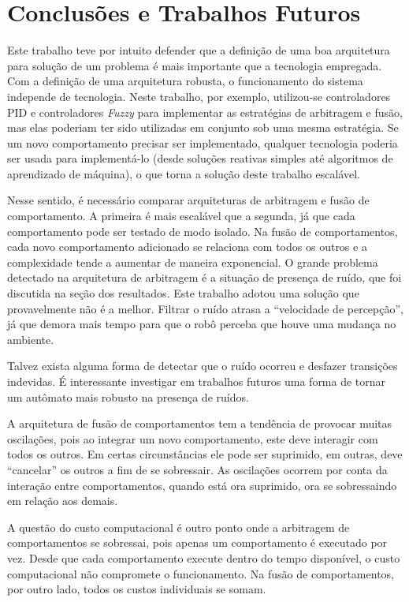 \chapter{Conclusões e Trabalhos Futuros}
\vspace{-2.5 cm}

Este trabalho teve por intuito defender que a definição de uma boa arquitetura para solução de um problema é
mais importante que a tecnologia empregada. Com a definição de uma arquitetura robusta, o funcionamento do sistema 
independe de tecnologia. Neste trabalho, por exemplo, utilizou-se controladores PID e controladores \textit{Fuzzy}
para implementar as estratégias de arbitragem e fusão, mas elas poderiam ter sido utilizadas em conjunto sob uma mesma
estratégia. Se um novo comportamento precisar ser implementado, qualquer tecnologia poderia ser usada para 
implementá-lo (desde soluções reativas simples até algoritmos de aprendizado de máquina), o que torna a solução
deste trabalho escalável.

Nesse sentido, é necessário comparar arquiteturas de arbitragem e fusão de comportamento. A primeira é mais escalável
que a segunda, já que cada comportamento pode ser testado de modo isolado. Na fusão de comportamentos, cada novo
comportamento adicionado se relaciona com todos os outros e a complexidade tende a aumentar de maneira exponencial.
O grande problema detectado na arquitetura de arbitragem é a situação de presença de ruído, que foi discutida na seção
dos resultados. Este trabalho adotou uma solução que provavelmente não é a melhor. Filtrar o ruído atrasa a 
``velocidade de percepção'', já que demora mais tempo para que o robô perceba que houve uma mudança no ambiente. 

Talvez exista alguma forma de detectar que o ruído ocorreu e desfazer transições indevidas. É interessante 
investigar em trabalhos futuros uma forma de tornar um autômato mais robusto na presença de ruídos. 

A arquitetura de fusão de comportamentos tem a tendência de provocar muitas oscilações, pois ao integrar 
um novo comportamento, este deve interagir com todos os outros. Em certas circunstâncias ele pode ser suprimido, em
outras, deve ``cancelar'' os outros a fim de se sobressair. As oscilações ocorrem por conta da interação entre 
comportamentos, quando está ora suprimido, ora se sobressaindo em relação aos demais.

A questão do custo computacional é outro ponto onde a arbitragem de comportamentos se sobressai,
pois apenas um comportamento é executado por vez. Desde que cada comportamento execute dentro
do tempo disponível, o custo computacional não compromete o funcionamento. Na fusão de 
comportamentos, por outro lado, todos os custos individuais se somam. 

